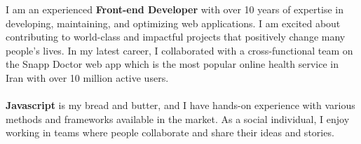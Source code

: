\documentclass[8pt]{developercv} %
\begin{document}
    \begin{minipage}[t]{0.5\textwidth}
        \vspace{-6pt}

        I am an experienced \textbf{Front-end Developer} with over 10 years of expertise in developing, maintaining, and optimizing web applications.
        I am excited about contributing to world-class and impactful projects that positively change many people’s lives.
        In my latest career, I collaborated with a cross-functional team on the Snapp Doctor web app which is the most popular online health service in Iran with over 10 million active users.
        \\
        \\
        \textbf{Javascript} is my bread and butter, and I have hands-on experience with various methods and frameworks available in the market.
        As a social individual, I enjoy working in teams where people collaborate and share their ideas and stories.

    \end{minipage}
    \hfill %
\end{document}
